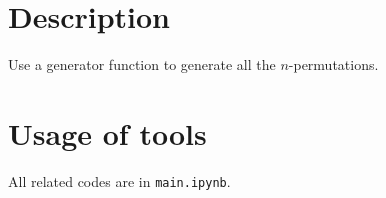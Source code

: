 \documentclass[english, nochinese]{../../TeXTemplate/pkupaper}
\title{\titlemark}
\author{pppppass}
\date{January 30, 2018}
\begin{document}
\maketitle

\section{Description}

Use a generator function to generate all the $n$-permutations.

\section{Usage of tools}

All related codes are in \verb"main.ipynb".
\end{document}
